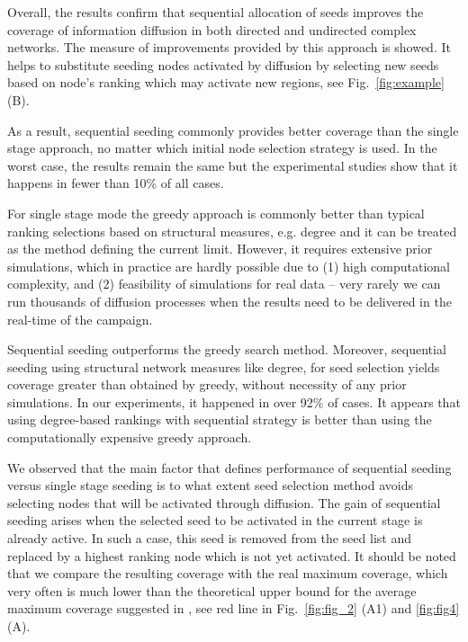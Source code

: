 \documentclass[11pt]{article} %
\begin{document}
Overall, the results confirm that sequential allocation of seeds improves the coverage of information diffusion in both directed and undirected complex networks. The  measure of improvements provided by this approach is showed. It helps to substitute seeding nodes activated by diffusion by selecting new seeds based on node's ranking which may activate new regions, see Fig.~\ref{fig:example} (B). 

As a result, sequential seeding commonly provides better coverage than the single stage approach, no matter which initial node selection strategy is used. In the worst case, the results remain the same but the experimental studies show that it happens in fewer than 10\% of all cases. 

For single stage mode the greedy approach is commonly better than typical ranking selections based on structural measures, e.g. degree and it can be treated as the method defining the current limit. However, it requires extensive prior simulations, which in practice are hardly possible due to (1) high computational complexity, and (2) feasibility of simulations for real data -- very rarely we can run thousands of diffusion processes when the results need to be delivered in the real-time of the campaign.

Sequential seeding outperforms the greedy search method. Moreover, sequential seeding using structural network measures like degree, for seed selection yields coverage greater than obtained by greedy, without necessity of any prior simulations. In our experiments, it happened in over 92\% of cases. It appears that using degree-based rankings with sequential strategy is better than using the computationally expensive greedy approach.

We observed that the main factor that defines performance of sequential seeding versus single stage seeding is to what extent seed selection method avoids selecting nodes that will be activated through diffusion. The gain of sequential seeding arises when the selected seed to be activated in the current stage is already active. In such a case, this seed is removed from the seed list and replaced by a highest ranking node which is not yet activated. It should be noted that we compare the resulting coverage with the real maximum coverage, which very often is much lower than the theoretical upper bound for the average maximum coverage suggested in \cite{Kempe:2003,kempe2015}, see red line in Fig.~\ref{fig:fig_2} (A1) and \ref{fig:fig4} (A).
\end{document}
